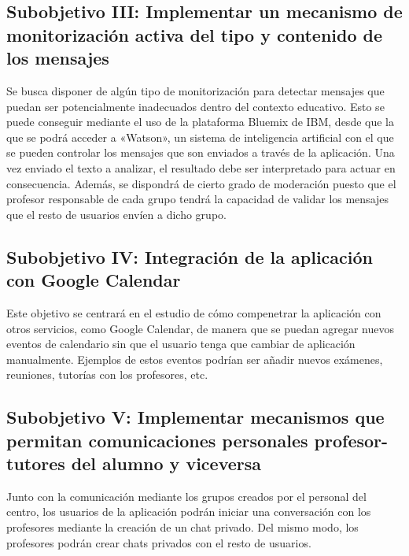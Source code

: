 \documentclass{pre-tfg}
\begin{document}
\subsection{Subobjetivo III: Implementar un mecanismo de monitorización activa del tipo y contenido de los mensajes}
Se busca disponer de algún tipo de monitorización para detectar mensajes que puedan ser potencialmente inadecuados dentro del contexto educativo. Esto se puede conseguir mediante el uso de la plataforma Bluemix de IBM, desde que la que se podrá acceder a «Watson», un sistema de inteligencia artificial con el que se pueden controlar los mensajes que son enviados a través de la aplicación. Una vez enviado el texto a analizar, el resultado debe ser interpretado para actuar en consecuencia. Además, se dispondrá de cierto grado de moderación puesto que el profesor responsable de cada grupo tendrá la capacidad de validar los mensajes que el resto de usuarios envíen a dicho grupo.

\subsection{Subobjetivo IV: Integración de la aplicación con Google Calendar}
Este objetivo se centrará en el estudio de cómo compenetrar la aplicación con otros servicios, como Google Calendar, de manera que se puedan agregar nuevos eventos de calendario sin que el usuario tenga que cambiar de aplicación manualmente. Ejemplos de estos eventos podrían ser añadir nuevos exámenes, reuniones, tutorías con los profesores, etc.

\subsection{Subobjetivo V: Implementar mecanismos que permitan comunicaciones personales profesor-tutores del alumno y viceversa}
Junto con la comunicación mediante los grupos creados por el personal del centro, los usuarios de la aplicación podrán iniciar una conversación con los profesores mediante la creación de un chat privado. Del mismo modo, los profesores podrán crear chats privados con el resto de usuarios.

%
%
%
\end{document}
